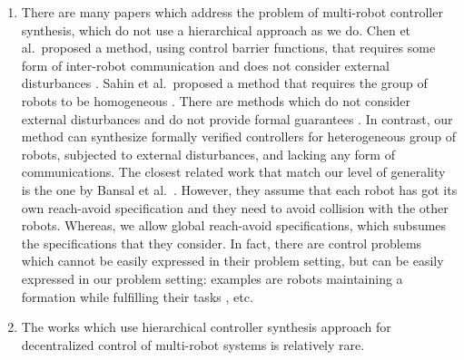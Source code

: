 \begin{enumerate}[(1)]
	\item There are many papers which address the problem of multi-robot controller synthesis, which do not use a hierarchical approach as we do.
	Chen et al.\ proposed a method, using control barrier functions, that requires some form of inter-robot communication and does not consider external disturbances \cite{Chen2018cbf}.
	Sahin et al.\ proposed a method that requires the group of robots to be homogeneous \cite{Shahin2017cltl}.
	There are methods which do not consider external disturbances and do not provide formal guarantees \cite{jackson2020scalable}.
	In contrast, our method can synthesize formally verified controllers for heterogeneous group of robots, subjected to external disturbances, and lacking any form of communications.
	The closest related work that match our level of generality is the one by Bansal et al.\ \cite{bansal2017safe}.
	However, they assume that each robot has got its own reach-avoid specification and they need to avoid collision with the other robots.
	Whereas, we allow global reach-avoid specifications, which subsumes the specifications that they consider.
	In fact, there are control problems which cannot be easily expressed in their problem setting, but can be easily expressed in our problem setting: 
	examples are robots maintaining a formation while fulfilling their tasks \cite{alonso2019distributed}, etc.
	\item  The works which use hierarchical controller synthesis approach for decentralized control of multi-robot systems is relatively rare.

\end{enumerate}
